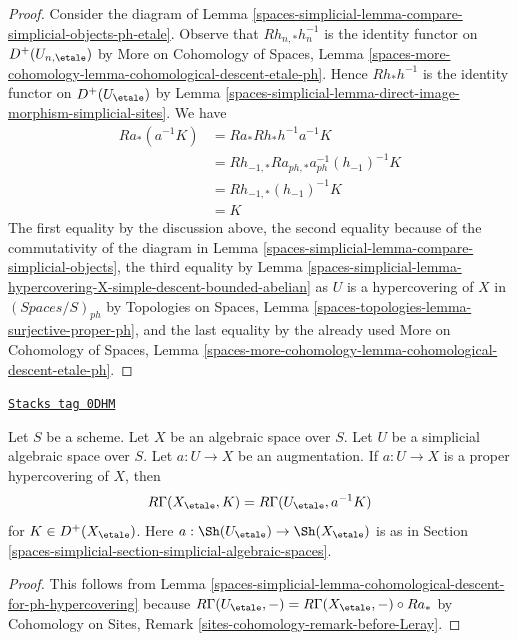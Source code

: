 \begin{proof}
Consider the diagram of Lemma \ref{spaces-simplicial-lemma-compare-simplicial-objects-ph-etale}.
Observe that $Rh_{n, *}h_n^{-1}$ is the identity functor
on $D^+(U_{n, \etale})$ by
More on Cohomology of Spaces, Lemma
\ref{spaces-more-cohomology-lemma-cohomological-descent-etale-ph}.
Hence $Rh_*h^{-1}$ is the identity functor on
$D^+(U_\etale)$ by
Lemma \ref{spaces-simplicial-lemma-direct-image-morphism-simplicial-sites}.
We have
\begin{align*}
Ra_*(a^{-1}K)
& =
Ra_*Rh_*h^{-1}a^{-1}K \\
& =
Rh_{-1, *}Ra_{ph, *}a_{ph}^{-1}(h_{-1})^{-1}K \\
& =
Rh_{-1, *}(h_{-1})^{-1}K \\
& =
K
\end{align*}
The first equality by the discussion above, the second equality
because of the commutativity of the diagram in
Lemma \ref{spaces-simplicial-lemma-compare-simplicial-objects}, the third equality by
Lemma \ref{spaces-simplicial-lemma-hypercovering-X-simple-descent-bounded-abelian}
as $U$ is a hypercovering of $X$ in $(\textit{Spaces}/S)_{ph}$
by Topologies on Spaces, Lemma
\ref{spaces-topologies-lemma-surjective-proper-ph},
and the last equality by the already used
More on Cohomology of Spaces, Lemma
\ref{spaces-more-cohomology-lemma-cohomological-descent-etale-ph}.
\end{proof}

\begin{lemma}
\label{spaces-simplicial-lemma-compute-via-ph-hypercovering}
\href{https://stacks.math.columbia.edu/tag/0DHM}{\texttt{Stacks tag 0DHM}}

Let $S$ be a scheme. Let $X$ be an algebraic space over $S$.
Let $U$ be a simplicial algebraic space over $S$. Let $a : U \to X$
be an augmentation. If $a : U \to X$ is a proper hypercovering of $X$, then
$$
R\Gamma(X_\etale, K) = R\Gamma(U_\etale, a^{-1}K)
$$
for $K \in D^+(X_\etale)$. Here $a : \Sh(U_\etale) \to \Sh(X_\etale)$
is as in Section \ref{spaces-simplicial-section-simplicial-algebraic-spaces}.
\end{lemma}

\begin{proof}
This follows from
Lemma \ref{spaces-simplicial-lemma-cohomological-descent-for-ph-hypercovering}
because $R\Gamma(U_\etale, -) = R\Gamma(X_\etale, -) \circ Ra_*$ by
Cohomology on Sites, Remark \ref{sites-cohomology-remark-before-Leray}.
\end{proof}

